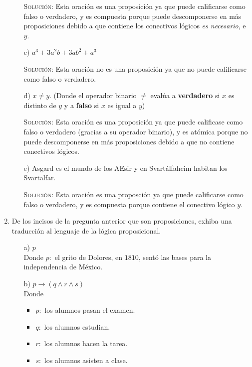 \documentclass[letterpaper,11pt]{article}
\begin{document}
\begin{enumerate}
\begin{itemize}
        \textsc{Solución:} Esta oración es una proposición ya que puede 
        calificarse como falso o verdadero, y es compuesta porque puede 
        descomponerse en más proposiciones debido a que contiene los conectivos
        lógicos \textit{es necesario}, e $y$.

        \item[c)] $a^{3} + 3a^{2}b + 3ab^{2} + a^{3}$

        \textsc{Solución:} Esta oración no es una proposición ya que no puede 
        calificarse como falso o verdadero.

        \item[d)] $x \neq y$. (Donde el operador binario $\neq$ evalúa a 
        \textbf{verdadero} si $x$ es distinto de $y$ y a \textbf{falso} si 
        $x$ es igual a $y$)

        \textsc{Solución:} Esta oración es una proposición ya que puede 
        calificase como falso o verdadero (gracias a su operador binario), y es 
        atómica porque no puede descomponerse en más proposiciones debido a que 
        no contiene conectivos lógicos. 

        \item[e)] Asgard es el mundo de los AEsir y en Svartálfaheim habitan los 
        Svartalfar.

        \textsc{Solución:} Esta oración es una proposción ya que puede 
        calificarse como falso o verdadero, y es compuesta porque contiene el 
        conectivo lógico $y$. 
    \end{itemize}

    \newpage
    \item De los incisos de la pregunta anterior que son proposiciones, exhiba
    una traducción al lenguaje de la lógica proposicional.

    \begin{itemize}
        \item[a)] $p$ \\ 
        Donde $p:$ el grito de Dolores, en $1810$, sentó las bases para la 
        independencia de México.

        \item[b)] $p → (q \land r \land s)$ \\ 
        Donde 
        \begin{itemize}
            \item $p:$ los alumnos pasan el examen.
            \item $q:$ los alumnos estudian.
            \item $r:$ los alumnos hacen la tarea.
            \item $s:$ los alumnos asisten a clase.
        \end{itemize}
    

\end{itemize}
\end{enumerate}
\end{document}
